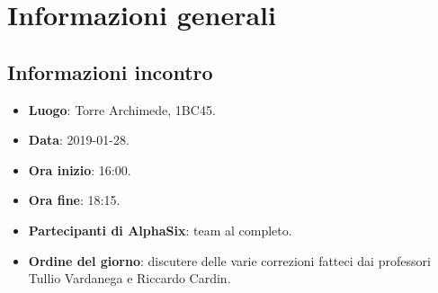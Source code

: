 \newcommand{\documento}{\VI}
\newcommand{\nomedocumentofisico}{VI\_2019-01-28.pdf}
\newcommand{\redazione}{\SG}
\newcommand{\verifica}{\NC}
\newcommand{\approvazione}{\LC}
\newcommand{\versione}{1.0.0}
\newcommand{\uso}{Interno}
\newcommand{\destinateTo}{\gruppo}
\newcommand{\datacreazione}{01 febbraio 2019}
\newcommand{\datamodifica}{03 febbraio 2019}
\newcommand{\stato}{Approvato}

\def\TABELLE{false}	%
\def\FIGURE{false} 	%






    

    	
    
    \section{Informazioni generali}
		\subsection{Informazioni incontro}
			\begin{itemize}
				\item \textbf{Luogo}: Torre Archimede, 1BC45.
				\item \textbf{Data}: 2019-01-28.
				\item \textbf{Ora inizio}: 16:00.
				\item \textbf{Ora fine}: 18:15.
				\item \textbf{Partecipanti di AlphaSix}: team al completo.
				\item \textbf{Ordine del giorno}: discutere delle varie correzioni fatteci dai professori Tullio Vardanega e Riccardo Cardin.
			\end{itemize}


